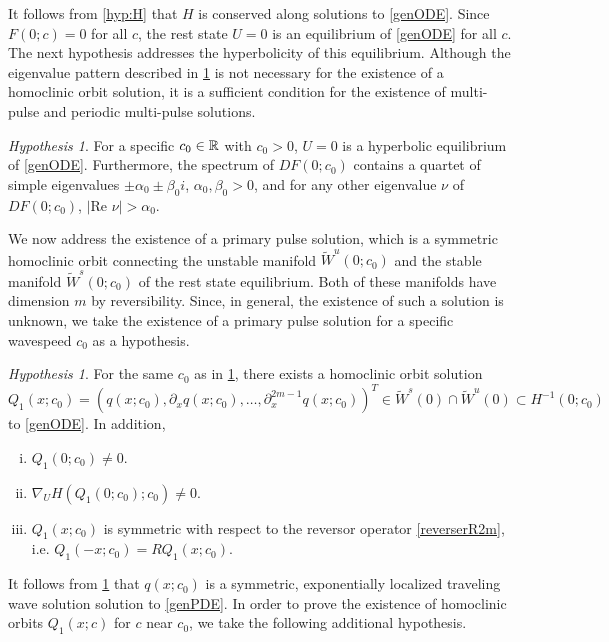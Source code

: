 \documentclass[10pt,reqno]{amsart}
\theoremstyle{plain}
\theoremstyle{definition}
\theoremstyle{remark}
\newtheorem{hypothesis}[theorem]{Hypothesis}
\numberwithin{theorem}{section}
\numberwithin{equation}{section}
\begin{document}
\noi It follows from \cref{hyp:H} that $H$ is conserved along solutions to \cref{genODE}. Since $F(0; c) = 0$ for all $c$, the rest state $U = 0$ is an equilibrium of \cref{genODE} for all $c$. The next hypothesis addresses the hyperbolicity of this equilibrium. Although the eigenvalue pattern described in \cref{hyp:hypeq} is not necessary for the existence of a homoclinic orbit solution, it is a sufficient condition for the existence of multi-pulse and periodic multi-pulse solutions.

\begin{hypothesis}\label{hyp:hypeq}
For a specific $c_0 \in \mathbb{R}$ with $c_0 > 0$, $U = 0$ is a hyperbolic equilibrium of \cref{genODE}. Furthermore, the spectrum of $DF(0; c_0)$ contains a quartet of simple eigenvalues $\pm \alpha_0 \pm \beta_0 i$, $\alpha_0, \beta_0 > 0$, and for any other eigenvalue $\nu$ of $DF(0; c_0)$, $|\text{Re }\nu| > \alpha_0$.
\end{hypothesis}

We now address the existence of a primary pulse solution, which is a symmetric homoclinic orbit connecting the unstable manifold $\tilde{W}^u(0; c_0)$ and the stable manifold $\tilde{W}^s(0; c_0)$ of the rest state equilibrium. Both of these manifolds have dimension $m$ by reversibility. Since, in general, the existence of such a solution is unknown, we take the existence of a primary pulse solution for a specific wavespeed $c_0$ as a hypothesis.

\begin{hypothesis}\label{Qexistshyp}
For the same $c_0$ as in \cref{hyp:hypeq}, there exists a homoclinic orbit solution $Q_1(x; c_0) = (q(x; c_0), \partial_x q(x; c_0), \dots, \partial_x^{2m-1}q(x; c_0))^T\in \tilde{W}^s(0) \cap \tilde{W}^u(0) \subset H^{-1}(0; c_0)$ to \cref{genODE}. In addition,
\begin{enumerate}[(i)]
\item $Q_1(0; c_0) \neq 0$.
\item $\nabla_U H(Q_1(0; c_0); c_0) \neq 0$.
\item $Q_1(x; c_0)$ is symmetric with respect to the reversor operator \cref{reverserR2m}, i.e. $Q_1(-x; c_0) = R Q_1(x; c_0)$.
\end{enumerate}
\end{hypothesis}

\noi It follows from \cref{Qexistshyp} that $q(x; c_0)$ is a symmetric, exponentially localized traveling wave solution solution to \cref{genPDE}. In order to prove the  existence of homoclinic orbits $Q_1(x; c)$ for $c$ near $c_0$, we take the following additional hypothesis.
\end{document}
